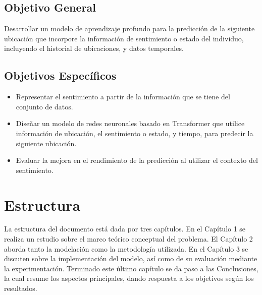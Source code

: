 \subsection{Objetivo General}

Desarrollar un modelo de aprendizaje profundo para la predicción de la siguiente ubicación que 
incorpore la información de sentimiento o estado del individuo, 
incluyendo el historial de ubicaciones, y datos 
temporales.

\subsection{Objetivos Específicos}

\begin{itemize}
    \item Representar el sentimiento a partir de la información 
    que se tiene del conjunto de datos.
    \item Diseñar un modelo de redes neuronales basado en Transformer que utilice 
    información de ubicación, el sentimiento o estado, y tiempo, para predecir 
    la siguiente ubicación.
    \item Evaluar la mejora en el rendimiento de la predicción al 
    utilizar el contexto del sentimiento.
\end{itemize}

\section{Estructura}
La estructura del documento est\'a dada por tres capítulos. En el 
Capítulo 1 se
realiza un estudio sobre el marco teórico conceptual del problema. 
El Capítulo 2 aborda tanto la modelación como la metodolog\'ia utilizada. 
En el Capítulo 3
se discuten sobre la implementación del modelo, as\'i como de su 
evaluaci\'on mediante la experimentaci\'on. Terminado este \'ultimo 
cap\'itulo
se da paso a las Conclusiones, la cual resume los aspectos 
principales,
dando respuesta a los objetivos según los resultados.